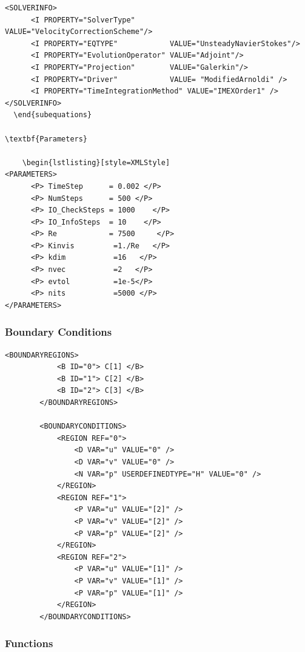     \begin{lstlisting}[style=XMLStyle]
<SOLVERINFO>
      <I PROPERTY="SolverType"        VALUE="VelocityCorrectionScheme"/>
      <I PROPERTY="EQTYPE"            VALUE="UnsteadyNavierStokes"/>
      <I PROPERTY="EvolutionOperator" VALUE="Adjoint"/>
      <I PROPERTY="Projection"        VALUE="Galerkin"/>
      <I PROPERTY="Driver"            VALUE= "ModifiedArnoldi" />
      <I PROPERTY="TimeIntegrationMethod" VALUE="IMEXOrder1" />
</SOLVERINFO>
  \end{subequations}

\textbf{Parameters}

    \begin{lstlisting}[style=XMLStyle]
<PARAMETERS>
      <P> TimeStep      = 0.002 </P>
      <P> NumSteps      = 500 </P>
      <P> IO_CheckSteps = 1000    </P>
      <P> IO_InfoSteps  = 10    </P>
      <P> Re            = 7500     </P>
      <P> Kinvis         =1./Re   </P>
      <P> kdim           =16   </P>
      <P> nvec           =2   </P>
      <P> evtol          =1e-5</P>
      <P> nits           =5000 </P>
</PARAMETERS>
  \end{lstlisting}

\subsubsection{Boundary Conditions}

    \begin{lstlisting}[style=XMLStyle]
 <BOUNDARYREGIONS>
            <B ID="0"> C[1] </B>
            <B ID="1"> C[2] </B>
            <B ID="2"> C[3] </B>
        </BOUNDARYREGIONS>

        <BOUNDARYCONDITIONS>
            <REGION REF="0">
                <D VAR="u" VALUE="0" />
                <D VAR="v" VALUE="0" />
                <N VAR="p" USERDEFINEDTYPE="H" VALUE="0" />
            </REGION>
            <REGION REF="1">
                <P VAR="u" VALUE="[2]" />
                <P VAR="v" VALUE="[2]" />
                <P VAR="p" VALUE="[2]" />
            </REGION>
            <REGION REF="2">
                <P VAR="u" VALUE="[1]" />
                <P VAR="v" VALUE="[1]" />
                <P VAR="p" VALUE="[1]" />
            </REGION>
        </BOUNDARYCONDITIONS>
  \end{lstlisting}


\subsubsection{Functions}

